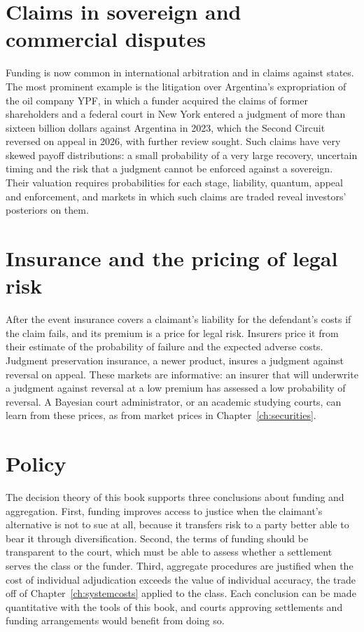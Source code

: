 \section{Claims in sovereign and commercial disputes}

Funding is now common in international arbitration and in claims against states. The most prominent example is the litigation over Argentina's expropriation of the oil company YPF, in which a funder acquired the claims of former shareholders and a federal court in New York entered a judgment of more than sixteen billion dollars against Argentina in 2023, which the Second Circuit reversed on appeal in 2026, with further review sought. Such claims have very skewed payoff distributions: a small probability of a very large recovery, uncertain timing and the risk that a judgment cannot be enforced against a sovereign. Their valuation requires probabilities for each stage, liability, quantum, appeal and enforcement, and markets in which such claims are traded reveal investors' posteriors on them.

\section{Insurance and the pricing of legal risk}

After the event insurance covers a claimant's liability for the defendant's costs if the claim fails, and its premium is a price for legal risk. Insurers price it from their estimate of the probability of failure and the expected adverse costs. Judgment preservation insurance, a newer product, insures a judgment against reversal on appeal. These markets are informative: an insurer that will underwrite a judgment against reversal at a low premium has assessed a low probability of reversal. A Bayesian court administrator, or an academic studying courts, can learn from these prices, as from market prices in Chapter~\ref{ch:securities}.

\section{Policy}

The decision theory of this book supports three conclusions about funding and aggregation. First, funding improves access to justice when the claimant's alternative is not to sue at all, because it transfers risk to a party better able to bear it through diversification. Second, the terms of funding should be transparent to the court, which must be able to assess whether a settlement serves the class or the funder. Third, aggregate procedures are justified when the cost of individual adjudication exceeds the value of individual accuracy, the trade off of Chapter~\ref{ch:systemcosts} applied to the class. Each conclusion can be made quantitative with the tools of this book, and courts approving settlements and funding arrangements would benefit from doing so.

